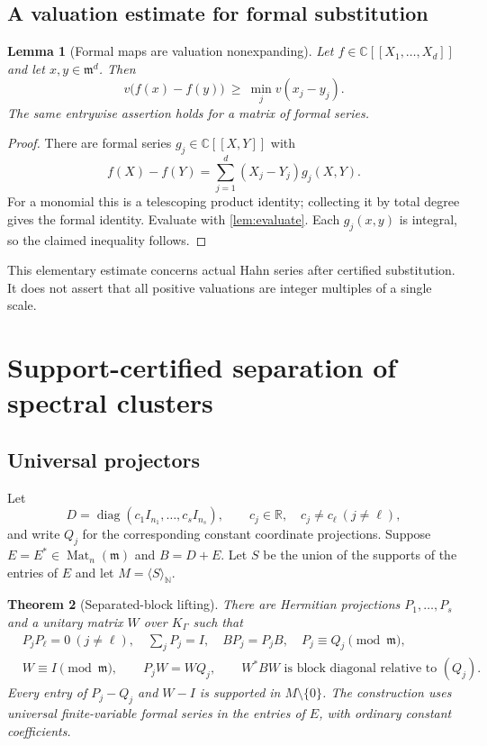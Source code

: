 \documentclass[11pt,letterpaper]{article}
\numberwithin{equation}{section}
\newtheorem{theorem}{Theorem}[section]
\newtheorem{lemma}[theorem]{Lemma}
\theoremstyle{definition}
\theoremstyle{remark}
\newcommand{\R}{\mathbb R}
\newcommand{\C}{\mathbb C}
\newcommand{\N}{\mathbb N}
\newcommand{\mm}{\mathfrak m}
\newcommand{\Mat}{\operatorname{Mat}}
\newcommand{\diag}{\operatorname{diag}}
\newcommand{\ang}[1]{\langle#1\rangle}
\newcommand{\KG}{K_{\Gamma}}
\begin{document}
\subsection{A valuation estimate for formal substitution}

\begin{lemma}[Formal maps are valuation nonexpanding]\label{lem:lipschitz}
Let $f\in\C[[X_1,\ldots,X_d]]$ and let $x,y\in\mm^d$. Then
\[
 v\bigl(f(x)-f(y)\bigr)\ \ge\ \min_jv(x_j-y_j).
\]
The same entrywise assertion holds for a matrix of formal series.
\end{lemma}
\begin{proof}
There are formal series $g_j\in\C[[X,Y]]$ with
\[
 f(X)-f(Y)=\sum_{j=1}^d(X_j-Y_j)g_j(X,Y).
\]
For a monomial this is a telescoping product identity; collecting it by total
degree gives the formal identity. Evaluate with \cref{lem:evaluate}.
Each $g_j(x,y)$ is integral, so the claimed inequality follows.
\end{proof}

This elementary estimate concerns actual Hahn series after certified
substitution. It does not assert that all positive valuations are integer
multiples of a single scale.

\section{Support-certified separation of spectral clusters}
\label{sec:split}

\subsection{Universal projectors}

Let
\begin{equation}\label{eq:D}
 D=\diag(c_1I_{n_1},\ldots,c_sI_{n_s}),
 \qquad c_j\in\R,\quad c_j\ne c_\ell\ (j\ne\ell),
\end{equation}
and write $Q_j$ for the corresponding constant coordinate projections.
Suppose $E=E^*\in\Mat_n(\mm)$ and $B=D+E$. Let $S$ be the union of the
supports of the entries of $E$ and let $M=\ang{S}_{\N}$.

\begin{theorem}[Separated-block lifting]\label{thm:split}
There are Hermitian projections $P_1,\ldots,P_s$ and a unitary matrix $W$
over $\KG$ such that
\begin{align}
 &P_jP_\ell=0\ (j\ne\ell),\quad \sum_jP_j=I,\quad BP_j=P_jB,
       \quad P_j\equiv Q_j\pmod{\mm},\label{eq:projectors}\\
 &W\equiv I\pmod{\mm},\qquad P_jW=WQ_j,\qquad
 W^*BW\text{ is block diagonal relative to }(Q_j).\label{eq:W}
\end{align}
Every entry of $P_j-Q_j$ and $W-I$ is supported in $M\setminus\{0\}$.
The construction uses universal finite-variable formal series in the entries
of $E$, with ordinary constant coefficients.
\end{theorem}
\end{document}

